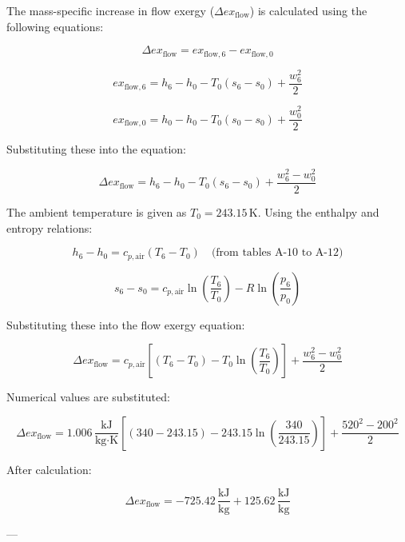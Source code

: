 The mass-specific increase in flow exergy (\( \Delta ex_{\text{flow}} \)) is calculated using the following equations:

\[
\Delta ex_{\text{flow}} = ex_{\text{flow},6} - ex_{\text{flow},0}
\]

\[
ex_{\text{flow},6} = h_6 - h_0 - T_0 (s_6 - s_0) + \frac{w_6^2}{2}
\]

\[
ex_{\text{flow},0} = h_0 - h_0 - T_0 (s_0 - s_0) + \frac{w_0^2}{2}
\]

Substituting these into the equation:

\[
\Delta ex_{\text{flow}} = h_6 - h_0 - T_0 (s_6 - s_0) + \frac{w_6^2 - w_0^2}{2}
\]

The ambient temperature is given as \( T_0 = 243.15 \, \text{K} \). Using the enthalpy and entropy relations:

\[
h_6 - h_0 = c_{p,\text{air}} (T_6 - T_0) \quad \text{(from tables A-10 to A-12)}
\]

\[
s_6 - s_0 = c_{p,\text{air}} \ln \left( \frac{T_6}{T_0} \right) - R \ln \left( \frac{p_6}{p_0} \right)
\]

Substituting these into the flow exergy equation:

\[
\Delta ex_{\text{flow}} = c_{p,\text{air}} \left[ (T_6 - T_0) - T_0 \ln \left( \frac{T_6}{T_0} \right) \right] + \frac{w_6^2 - w_0^2}{2}
\]

Numerical values are substituted:

\[
\Delta ex_{\text{flow}} = 1.006 \, \frac{\text{kJ}}{\text{kg·K}} \left[ (340 - 243.15) - 243.15 \ln \left( \frac{340}{243.15} \right) \right] + \frac{520^2 - 200^2}{2}
\]

After calculation:

\[
\Delta ex_{\text{flow}} = -725.42 \, \frac{\text{kJ}}{\text{kg}} + 125.62 \, \frac{\text{kJ}}{\text{kg}}
\]

---